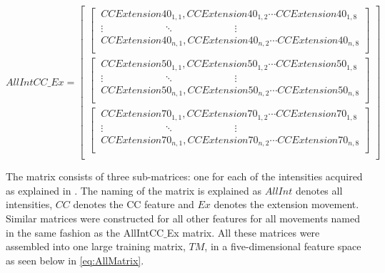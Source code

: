 \begin{equation} \label{eq:CCMatrix}
AllIntCC\_Ex=\begin{bmatrix} 
\begin{bmatrix}
\ CCExtension40_{1,1}, CCExtension40_{1,2} \cdots CCExtension40_{1,8} \\ 
\ \vdots \qquad \qquad \qquad \ddots \qquad \qquad \qquad \vdots \\
\ CCExtension40_{n,1}, CCExtension40_{n,2}  \cdots CCExtension40_{n,8} \\ \end{bmatrix} \\
\begin{bmatrix} 
\ CCExtension50_{1,1}, CCExtension50_{1,2} \cdots CCExtension50_{1,8} \\
\ \vdots \qquad \qquad \qquad \ddots \qquad \qquad \qquad \vdots \\
\ CCExtension50_{n,1}, CCExtension50_{n,2} \cdots CCExtension50_{n,8} \\ \end{bmatrix} \\
\begin{bmatrix} 
\ CCExtension70_{1,1}, CCExtension70_{1,2} \cdots CCExtension70_{1,8} \\
\ \vdots \qquad \qquad \qquad \ddots \qquad \qquad \qquad \vdots \\
\ CCExtension70_{n,1}, CCExtension70_{n,2} \cdots CCExtension70_{n,8} \\ \end{bmatrix} \\
\end{bmatrix}
\end{equation}

The matrix consists of three sub-matrices: one for each of the intensities acquired as explained in . The naming of the matrix is explained as $AllInt$ denotes all intensities, $CC$ denotes the CC feature and $Ex$ denotes the extension movement. Similar matrices were constructed for all other features for all movements named in the same fashion as the AllIntCC$\_$Ex matrix. All these matrices were assembled into one large training matrix, $TM$, in a five-dimensional feature space as seen below in \eqref{eq:AllMatrix}. 


